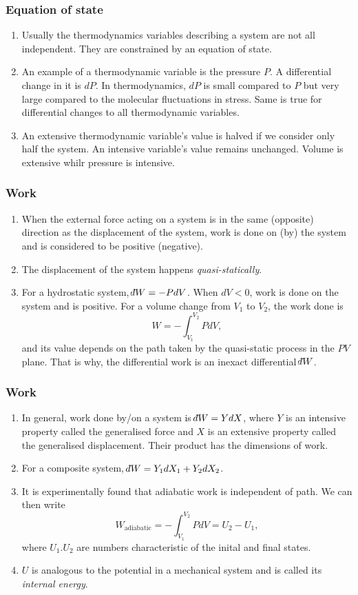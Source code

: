 \documentclass{beamer}
\newcommand{\dbar}{{\mathchar'26\mkern-13mu d}}
\begin{document}
\begin{frame}
\frametitle{Equation of state}
\begin{enumerate}
\item Usually the thermodynamics variables describing a system are not all independent. They are constrained by an equation of
state.
\item An example of a thermodynamic variable is the pressure $P$. A differential change in it is $dP$. In thermodynamics, $dP$
is small compared to $P$ but very large compared to the molecular fluctuations in stress. Same is true for differential changes
to all thermodynamic variables.
\item An extensive thermodynamic variable's value is halved if we consider only half the system. An intensive variable's value
remains unchanged. Volume is extensive whilr pressure is intensive.
\end{enumerate}
\end{frame}

\begin{frame}
\frametitle{Work}
\begin{enumerate}
\item When the external force acting on a system is in the same (opposite) direction as the displacement of the system, work is 
done on (by) the system and is considered to be positive (negative). 
\item The displacement of the system happens \emph{quasi-statically}. 
\item For a hydrostatic system, $\dbar W = -PdV$. When $dV < 0$, work is done on the system and is positive. For a volume change
from $V_1$ to $V_2$, the work done is
\[
W = -\int_{V_1}^{V_2}PdV,
\]
and its value depends on the path taken by the quasi-static process in the $PV$ plane. That is why, the differential work
is an inexact differential $\dbar W$.

\end{enumerate}
\end{frame}

\begin{frame}
\frametitle{Work}
\begin{enumerate}
\item In general, work done by/on a system is $\dbar W = YdX$, where $Y$ is an intensive property called the generalised
force and $X$ is an extensive property called the generalised displacement. Their product has the dimensions of work.
\item For a composite system, $\dbar W = Y_1dX_1 + Y_2dX_2$.
\item It is experimentally found that adiabatic work is independent of path. We can then write
\[
W_{\text{adiabatic}} = -\int_{V_1}^{V_2}PdV = U_2 - U_1,
\]
where $U_1. U_2$ are numbers characteristic of the inital and final states.
\item $U$ is analogous to the potential in a mechanical system and is called its \emph{internal energy}.
\end{enumerate}
\end{frame}
\end{document}
